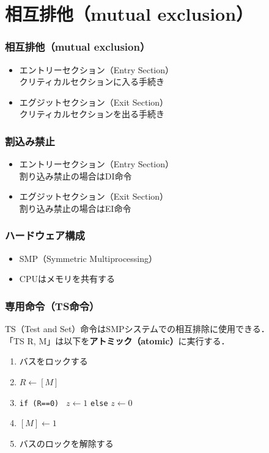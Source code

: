 \documentclass{beamer}                   %
\begin{document}
\section{相互排他（mutual exclusion）}
\begin{frame}
  \frametitle{相互排他（mutual exclusion）}
  \begin{itemize}
  \item エントリーセクション（Entry Section）\\
    クリティカルセクションに入る手続き
  \item エグジットセクション（Exit Section）\\
    クリティカルセクションを出る手続き
  \end{itemize}
\end{frame}

\begin{frame}
  \frametitle{割込み禁止}
  
  \begin{itemize}
  \item エントリーセクション（Entry Section）\\
    割り込み禁止の場合はDI命令
  \item エグジットセクション（Exit Section）\\
    割り込み禁止の場合はEI命令
  \end{itemize}
\end{frame}

\begin{frame}
  \frametitle{ハードウェア構成}
  \begin{itemize}
    \item SMP（Symmetric Multiprocessing）
    \item CPUはメモリを共有する
  \end{itemize}
\end{frame}

\begin{frame}
  \frametitle{専用命令（TS命令）}
  TS（Test and Set）命令はSMPシステムでの相互排除に使用できる．\\
  「TS  R, M」は以下を{\bf アトミック（atomic）}に実行する．
  \begin{enumerate}
  \item バスをロックする
  \item $R \leftarrow [M]$
  \item {\tt if (R==0) } $z \leftarrow 1$ {\tt else} $z \leftarrow 0$
  \item $[M] \leftarrow 1$
  \item バスのロックを解除する
  \end{enumerate}
\end{frame}
\end{document}
